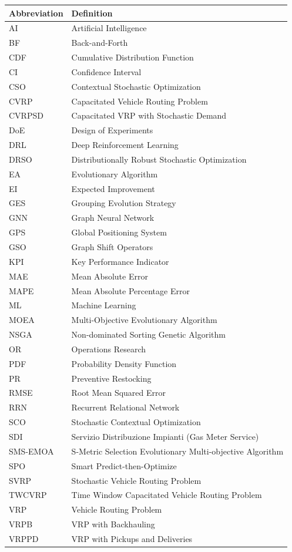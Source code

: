 \documentclass[preprint,12pt]{elsarticle}
\begin{document}
\begin{table}[H]
\begin{tabular}{ll}
\toprule
\textbf{Abbreviation} & \textbf{Definition} \\
\midrule
AI & Artificial Intelligence \\
BF & Back-and-Forth \\
CDF & Cumulative Distribution Function \\
CI & Confidence Interval \\
CSO & Contextual Stochastic Optimization \\
CVRP & Capacitated Vehicle Routing Problem \\
CVRPSD & Capacitated VRP with Stochastic Demand \\
DoE & Design of Experiments \\
DRL & Deep Reinforcement Learning \\
DRSO & Distributionally Robust Stochastic Optimization \\
EA & Evolutionary Algorithm \\
EI & Expected Improvement \\
GES & Grouping Evolution Strategy \\
GNN & Graph Neural Network \\
GPS & Global Positioning System \\
GSO & Graph Shift Operators \\
KPI & Key Performance Indicator \\
MAE & Mean Absolute Error \\
MAPE & Mean Absolute Percentage Error \\
ML & Machine Learning \\
MOEA & Multi-Objective Evolutionary Algorithm \\
NSGA & Non-dominated Sorting Genetic Algorithm \\
OR & Operations Research \\
PDF & Probability Density Function \\
PR & Preventive Restocking \\
RMSE & Root Mean Squared Error \\
RRN & Recurrent Relational Network \\
SCO & Stochastic Contextual Optimization \\
SDI & Servizio Distribuzione Impianti (Gas Meter Service) \\
SMS-EMOA & S-Metric Selection Evolutionary Multi-objective Algorithm \\
SPO & Smart Predict-then-Optimize \\
SVRP & Stochastic Vehicle Routing Problem \\
TWCVRP & Time Window Capacitated Vehicle Routing Problem \\
VRP & Vehicle Routing Problem \\
VRPB & VRP with Backhauling \\
VRPPD & VRP with Pickups and Deliveries \\
\bottomrule
\end{tabular}
\end{table}
\end{document}
